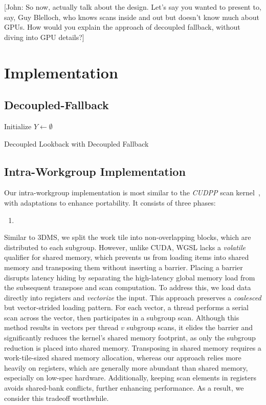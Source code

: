 \documentclass[sigconf]{acmart}
\newcommand{\john}[1]{{\footnotesize\color{cyan}[John: #1]}}
\begin{document}
\john{So now, actually talk about the design. Let's say you wanted to present to, say, Guy Blelloch, who knows scans inside and out but doesn't know much about GPUs. How would you explain the approach of decoupled fallback, without diving into GPU details?}

\section{Implementation}

\subsection{Decoupled-Fallback}

\begin{algorithm}[htbp]
  \SetAlgoLined
  Initialize $Y \leftarrow \emptyset$\;
  \;
  \caption{Decoupled Lookback with Decoupled Fallback}
  \label{alg:example}
\end{algorithm}

\subsection{Intra-Workgroup Implementation}
Our intra-workgroup implementation is most similar to the \emph{CUDPP} scan kernel~\cite{}, with adaptations to enhance portability. It consists of three phases:
\begin{enumerate}
  \item
\end{enumerate}

Similar to 3DMS, we split the work tile into non-overlapping blocks, which are distributed to each subgroup. However, unlike CUDA, WGSL lacks a \emph{volatile} qualifier for shared memory, which prevents us from loading items into shared memory and transposing them without inserting a barrier. Placing a barrier disrupts latency hiding by separating the high-latency global memory load from the subsequent transpose and scan computation. To address this, we load data directly into registers and \emph{vectorize} the input. This approach preserves a \emph{coalesced} but vector-strided loading pattern. For each vector, a thread performs a serial scan across the vector, then participates in a subgroup scan. Although this method results in vectors per thread $v$ subgroup scans, it elides the barrier and significantly reduces the kernel's shared memory footprint, as only the subgroup reduction is placed into shared memory. Transposing in shared memory requires a work-tile-sized shared memory allocation, whereas our approach relies more heavily on registers, which are generally more abundant than shared memory, especially on low-spec hardware. Additionally, keeping scan elements in registers avoids shared-bank conflicts, further enhancing performance. As a result, we consider this tradeoff worthwhile.
\end{document}
